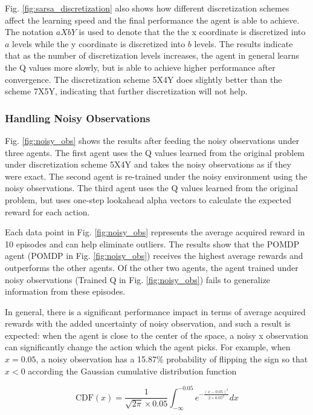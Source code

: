 \documentclass[10pt, conference]{IEEEtran}
\begin{document}
Fig. \ref{fig:sarsa_discretization} also shows how different discretization schemes affect the learning speed and the final performance the agent is able to achieve. The notation $aXbY$ is used to denote that the the x coordinate is discretized into $a$ levels while the y coordinate is discretized into $b$ levels. The results indicate that as the number of discretization levels increases, the agent in general learns the Q values more slowly, but is able to achieve higher performance after convergence. The discretization scheme 5X4Y does slightly better than the scheme 7X5Y, indicating that further discretization will not help.



\subsubsection{Handling Noisy Observations}
Fig. \ref{fig:noisy_obs} shows the results after feeding the noisy observations under three agents. The first agent uses the Q values learned from the original problem under discretization scheme 5X4Y and takes the noisy observations as if they were exact. The second agent is re-trained under the noisy environment using the noisy observations. The third agent uses the Q values learned from the original problem, but uses one-step lookahead alpha vectors to calculate the expected reward for each action.

Each data point in Fig. \ref{fig:noisy_obs} represents the average acquired reward in 10 episodes and can help eliminate outliers. The results show that the POMDP agent (POMDP in Fig. \ref{fig:noisy_obs}) receives the highest average rewards and outperforms the other agents. Of the other two agents, the agent trained under noisy observations (Trained Q in Fig. \ref{fig:noisy_obs}) fails to generalize information from these episodes.

In general, there is a significant performance impact in terms of average acquired rewards with the added uncertainty of noisy observation, and such a result is expected: when the agent is close to the center of the space, a noisy x observation can significantly change the action which the agent picks. For example, when $x = 0.05$, a noisy observation has a 15.87\% probability of flipping the sign so that $x < 0$ according the Gaussian cumulative distribution function

\begin{equation}
    \text{CDF}(x) = \frac{1}{\sqrt{2\pi} \times 0.05} \int_{-\infty}^{-0.05} e^{-\frac{(x - 0.05)^2}{2 \times 0.05^2}} dx
\end{equation}
\end{document}
